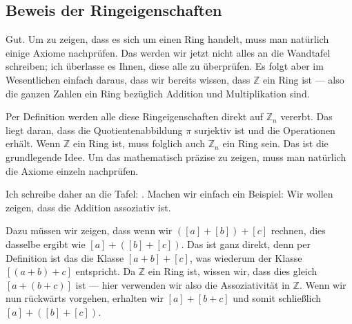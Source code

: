 \begin{math-stroke}
\end{math-stroke}

\subsection{Beweis der Ringeigenschaften}

\begin{spoken-clean}[00:09:39 - 00:13:25]
Gut. Um zu zeigen, dass es sich um einen Ring handelt, muss man natürlich einige Axiome nachprüfen. Das werden wir jetzt nicht alles an die Wandtafel schreiben; ich überlasse es Ihnen, diese alle zu überprüfen. Es folgt aber im Wesentlichen einfach daraus, dass wir bereits wissen, dass $\mathbb{Z}$ ein Ring ist --- also die ganzen Zahlen ein Ring bezüglich Addition und Multiplikation sind.

Per Definition werden alle diese Ringeigenschaften direkt auf $\mathbb{Z}_n$ vererbt. Das liegt daran, dass die Quotientenabbildung $\pi$ surjektiv ist und die Operationen erhält. Wenn $\mathbb{Z}$ ein Ring ist, muss folglich auch $\mathbb{Z}_n$ ein Ring sein. Das ist die grundlegende Idee. Um das mathematisch präzise zu zeigen, muss man natürlich die Axiome einzeln nachprüfen.

Ich schreibe daher an die Tafel: . Machen wir einfach ein Beispiel: Wir wollen zeigen, dass die Addition assoziativ ist.

Dazu müssen wir zeigen, dass wenn wir $([a] + [b]) + [c]$ rechnen, dies dasselbe ergibt wie $[a] + ([b] + [c])$. Das ist ganz direkt, denn per Definition ist das die Klasse $[a + b] + [c]$, was wiederum der Klasse $[(a + b) + c]$ entspricht. Da $\mathbb{Z}$ ein Ring ist, wissen wir, dass dies gleich $[a + (b + c)]$ ist --- hier verwenden wir also die Assoziativität in $\mathbb{Z}$. Wenn wir nun rückwärts vorgehen, erhalten wir $[a] + [b + c]$ und somit schließlich $[a] + ([b] + [c])$.
\end{spoken-clean}


